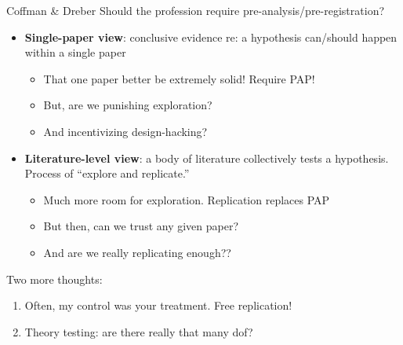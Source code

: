 \begin{frame}{Coffman \& Dreber}
    Should the profession require pre-analysis/pre-registration?
    \br
    \begin{itemize}
        \item \textbf{Single-paper view}: conclusive evidence re: a hypothesis can/should happen within a single paper
        \begin{itemize}
            \item That one paper better be extremely solid! Require PAP!
            \item But, are we punishing exploration?
            \item And incentivizing design-hacking?
        \end{itemize}
        \item \textbf{Literature-level view}: a body of literature collectively tests a hypothesis. Process of ``explore and replicate.''
        \begin{itemize}
            \item Much more room for exploration. Replication replaces PAP
            \item But then, can we trust any given paper?
            \item And are we really replicating enough??
        \end{itemize}
    \end{itemize}
    Two more thoughts:
    \begin{enumerate}
        \item Often, my control was your treatment. Free replication!
        \item Theory testing: are there really that many dof?
    \end{enumerate}
\end{frame}

